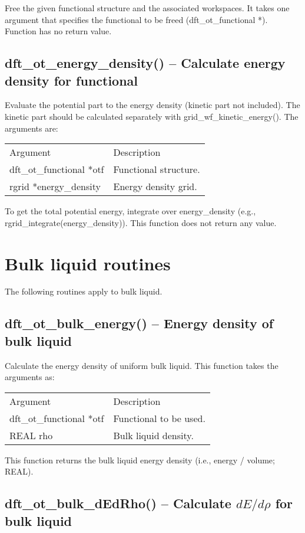 \documentclass[12pt,letterpaper]{report}
\begin{document}
Free the given functional structure and the associated workspaces. It takes one argument that specifies the functional to be freed (dft\_ot\_functional *). Function has no return value.

\subsection{dft\_ot\_energy\_density() -- Calculate energy density for functional}

Evaluate the potential part to the energy density (kinetic part not included). The kinetic part should be calculated separately with grid\_wf\_kinetic\_energy(). The arguments are:
\begin{longtable}{p{} p{}}
Argument & Description\\
\cline{1-2}
dft\_ot\_functional *otf & Functional structure.\\
rgrid *energy\_density & Energy density grid.\\
\end{longtable}
\noindent
To get the total potential energy, integrate over energy\_density (e.g., rgrid\_integrate(energy\_density)). This function does not return any value.

\section{Bulk liquid routines}

The following routines apply to bulk liquid.

\subsection{dft\_ot\_bulk\_energy() -- Energy density of bulk liquid}

Calculate the energy density of uniform bulk liquid. This function takes the arguments as:
\begin{longtable}{p{} p{}}
Argument & Description\\
\cline{1-2}
dft\_ot\_functional *otf & Functional to be used.\\
REAL rho & Bulk liquid density.\\
\end{longtable}
\noindent
This function returns the bulk liquid energy density (i.e., energy / volume; REAL).

\subsection{dft\_ot\_bulk\_dEdRho() -- Calculate $dE/d\rho$ for bulk liquid}
\end{document}
